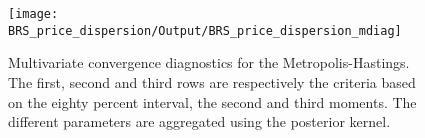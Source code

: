  
\begin{figure}[H]
\centering 
\texttt{[image: BRS\_price\_dispersion/Output/BRS\_price\_dispersion\_mdiag]}
\caption{Multivariate convergence diagnostics for the Metropolis-Hastings.
The first, second and third rows are respectively the criteria based on
the eighty percent interval, the second and third moments. The different 
parameters are aggregated using the posterior kernel.}\label{Fig:MultivariateDiagnostics}
\end{figure}


